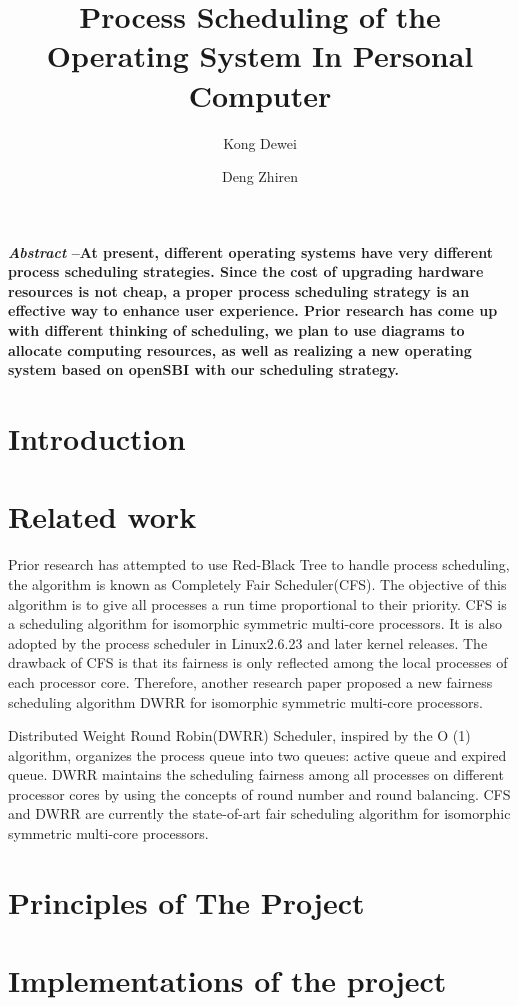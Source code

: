 \documentclass{article}
\title{Process Scheduling of the Operating System In Personal Computer }
\author{Kong Dewei}
\date{Deng Zhiren}
\begin{document}
\maketitle
\textbf{
    \emph{Abstract}
    --At present, different operating systems have very different process scheduling strategies.
    Since the cost of upgrading hardware resources is not cheap, a proper process scheduling strategy is an effective way to enhance user experience.
    Prior research has come up with different thinking of scheduling, we plan to use diagrams to allocate computing resources, as well as realizing a new operating system based on openSBI with our scheduling strategy.
}
\begin{multicols}{2}       %

\section{Introduction}



\section{Related work}
Prior research has attempted to use Red-Black Tree to handle process scheduling, the algorithm is known as Completely Fair Scheduler(CFS).
The objective of this algorithm is to give all processes a run time proportional to their priority.
CFS is a scheduling algorithm for isomorphic symmetric multi-core processors.
It is also adopted by the process scheduler in Linux2.6.23 and later kernel releases.
The drawback of CFS is that its fairness is only reflected among the local processes of each processor core.
Therefore, another research paper proposed a new fairness scheduling algorithm DWRR for isomorphic symmetric multi-core processors.

Distributed Weight Round Robin(DWRR) Scheduler, inspired by the O (1) algorithm, organizes the process queue into two queues: active queue and expired queue. DWRR maintains the scheduling fairness among all processes on different processor cores by using the concepts of round number and round balancing. CFS and DWRR are currently the state-of-art fair scheduling algorithm for isomorphic symmetric multi-core processors. 

\section{Principles of The Project}
\section{Implementations of the project}
\end{multicols}
\end{document}
